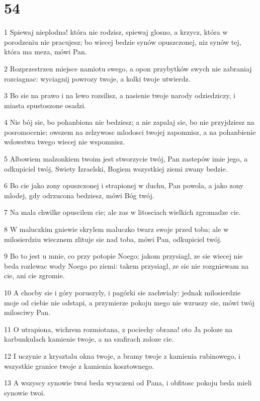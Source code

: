 \chapter{54}

\par 1 Spiewaj nieplodna! która nie rodzisz, spiewaj glosno, a krzycz, która w porodzeniu nie pracujesz; bo wiecej bedzie synów opuszczonej, niz synów tej, która ma meza, mówi Pan.
\par 2 Rozprzestrzen miejsce namiotu swego, a opon przybytków swych nie zabraniaj rozciagnac: wyciagnij powrozy twoje, a kolki twoje utwierdz.
\par 3 Bo sie na prawo i na lewo rozsilisz, a nasienie twoje narody odziedziczy, i miasta spustoszone osadzi.
\par 4 Nie bój sie, bo pohanbiona nie bedziesz; a nie zapalaj sie, bo nie przyjdziesz na posromocenie; owszem na zelzywosc mlodosci twojej zapomnisz, a na pohanbienie wdowstwa twego wiecej nie wspomnisz.
\par 5 Albowiem malzonkiem twoim jest stworzycie twój, Pan zastepów imie jego, a odkupiciel twój, Swiety Izraelski, Bogiem wszystkiej ziemi zwany bedzie.
\par 6 Bo cie jako zony opuszczonej i strapionej w duchu, Pan powola, a jako zony mlodej, gdy odrzucona bedziesz, mówi Bóg twój.
\par 7 Na mala chwilke opuscilem cie; ale zas w litosciach wielkich zgromadze cie.
\par 8 W maluczkim gniewie skrylem maluczko twarz swoje przed toba; ale w milosierdziu wiecznem zlituje sie nad toba, mówi Pan, odkupiciel twój.
\par 9 Bo to jest u mnie, co przy potopie Noego; jakom przysiagl, ze sie wiecej nie beda rozlewac wody Noego po ziemi: takem przysiagl, ze sie nie rozgniewam na cie, ani cie zgromie.
\par 10 A chocby sie i góry poruszyly, i pagórki sie zachwialy: jednak milosierdzie moje od ciebie nie odstapi, a przymierze pokoju mego nie wzruszy sie, mówi twój milosciwy Pan.
\par 11 O utrapiona, wichrem rozmiotana, z pociechy obrana! oto Ja poloze na karbunkulach kamienie twoje, a na szafirach zaloze cie.
\par 12 I uczynie z krysztalu okna twoje, a bramy twoje z kamienia rubinowego, i wszystkie granice twoje z kamienia kosztownego.
\par 13 A wszyscy synowie twoi beda wyuczeni od Pana, i obfitosc pokoju beda mieli synowie twoi.
